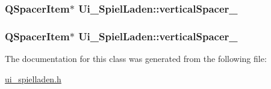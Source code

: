\hypertarget{classUi__SpielLaden_a5fbc0920408059f1d14de15ace1fe5bf}{
\subsubsection[{vertical\-Spacer\-\_\-5}]{\setlength{\rightskip}{0pt plus 5cm}Q\-Spacer\-Item$\ast$ Ui\-\_\-\-Spiel\-Laden\-::vertical\-Spacer\-\_}}\label{classUi__SpielLaden_a5fbc0920408059f1d14de15ace1fe5bf}
\hypertarget{classUi__SpielLaden_a9db7e5483d2da926204b66a7313bf423}{
\subsubsection[{vertical\-Spacer\-\_\-6}]{\setlength{\rightskip}{0pt plus 5cm}Q\-Spacer\-Item$\ast$ Ui\-\_\-\-Spiel\-Laden\-::vertical\-Spacer\-\_}}\label{classUi__SpielLaden_a9db7e5483d2da926204b66a7313bf423}


The documentation for this class was generated from the following file\-:\begin{DoxyCompactItemize}
\item 
\hyperlink{ui__spielladen_8h}{ui\-\_\-spielladen.\-h}\end{DoxyCompactItemize}
